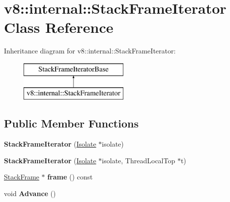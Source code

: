 \hypertarget{classv8_1_1internal_1_1_stack_frame_iterator}{}\section{v8\+:\+:internal\+:\+:Stack\+Frame\+Iterator Class Reference}
\label{classv8_1_1internal_1_1_stack_frame_iterator}
Inheritance diagram for v8\+:\+:internal\+:\+:Stack\+Frame\+Iterator\+:\begin{figure}[H]
\begin{center}
\leavevmode
\includegraphics[height=2.000000cm]{classv8_1_1internal_1_1_stack_frame_iterator}
\end{center}
\end{figure}
\subsection*{Public Member Functions}
\begin{DoxyCompactItemize}
\item 
{\bfseries Stack\+Frame\+Iterator} (\hyperlink{classv8_1_1internal_1_1_isolate}{Isolate} $\ast$isolate)\hypertarget{classv8_1_1internal_1_1_stack_frame_iterator_af08ff5917984721e9d3b0ea498d19333}{}\label{classv8_1_1internal_1_1_stack_frame_iterator_af08ff5917984721e9d3b0ea498d19333}

\item 
{\bfseries Stack\+Frame\+Iterator} (\hyperlink{classv8_1_1internal_1_1_isolate}{Isolate} $\ast$isolate, Thread\+Local\+Top $\ast$t)\hypertarget{classv8_1_1internal_1_1_stack_frame_iterator_a4f429dd1f6d793ed89d1a34c25335644}{}\label{classv8_1_1internal_1_1_stack_frame_iterator_a4f429dd1f6d793ed89d1a34c25335644}

\item 
\hyperlink{classv8_1_1_stack_frame}{Stack\+Frame} $\ast$ {\bfseries frame} () const \hypertarget{classv8_1_1internal_1_1_stack_frame_iterator_a589db497b5957249f91f7de02af3283b}{}\label{classv8_1_1internal_1_1_stack_frame_iterator_a589db497b5957249f91f7de02af3283b}

\item 
void {\bfseries Advance} ()\hypertarget{classv8_1_1internal_1_1_stack_frame_iterator_a50d8031f727ca2701312000d790e4b19}{}\label{classv8_1_1internal_1_1_stack_frame_iterator_a50d8031f727ca2701312000d790e4b19}

\end{DoxyCompactItemize}

